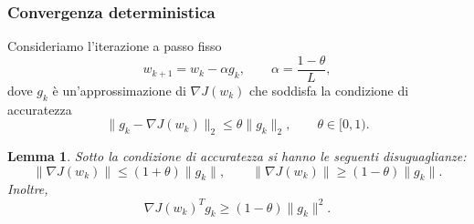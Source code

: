 \documentclass[a4paper,12pt]{article}
\newtheorem{lemma}{Lemma}
\begin{document}
\subsubsection{Convergenza deterministica}

Consideriamo l'iterazione a passo fisso
\[
w_{k+1} = w_k - \alpha g_k, \qquad \alpha = \frac{1-\theta}{L},
\]
dove $g_k$ è un'approssimazione di $\nabla J(w_k)$ che soddisfa la condizione di accuratezza
\[
\|g_k - \nabla J(w_k)\|_2 \leq \theta \|g_k\|_2, \qquad \theta \in [0,1).
\]

\begin{lemma}
  Sotto la condizione di accuratezza si hanno le seguenti disuguaglianze:
  \[
  \|\nabla J(w_k)\| \leq (1+\theta)\|g_k\|, \qquad
  \|\nabla J(w_k)\| \geq (1-\theta)\|g_k\|.
  \]
  Inoltre,
  \[
  \nabla J(w_k)^T g_k \geq (1-\theta)\|g_k\|^2.
  \]
\end{lemma}
\end{document}
